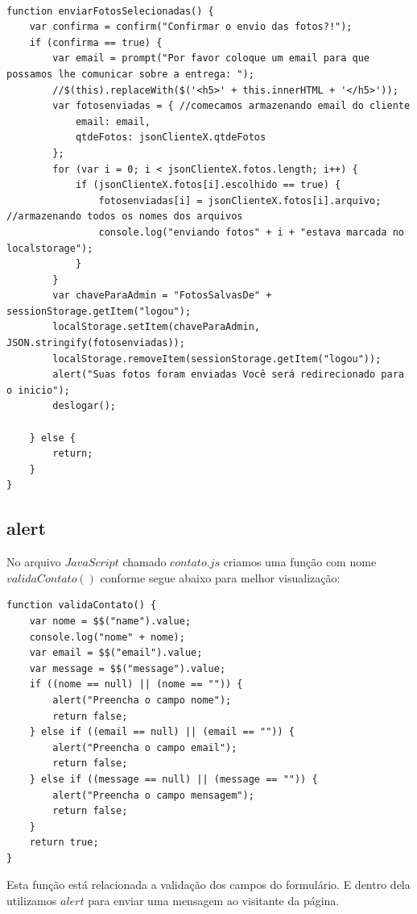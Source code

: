 \begin{lstlisting}

function enviarFotosSelecionadas() {
    var confirma = confirm("Confirmar o envio das fotos?!");
    if (confirma == true) {
        var email = prompt("Por favor coloque um email para que possamos lhe comunicar sobre a entrega: ");
        //$(this).replaceWith($('<h5>' + this.innerHTML + '</h5>'));
        var fotosenviadas = { //comecamos armazenando email do cliente
            email: email,
            qtdeFotos: jsonClienteX.qtdeFotos
        };
        for (var i = 0; i < jsonClienteX.fotos.length; i++) {
            if (jsonClienteX.fotos[i].escolhido == true) {
                fotosenviadas[i] = jsonClienteX.fotos[i].arquivo; //armazenando todos os nomes dos arquivos
                console.log("enviando fotos" + i + "estava marcada no localstorage");
            }
        }
        var chaveParaAdmin = "FotosSalvasDe" + sessionStorage.getItem("logou");
        localStorage.setItem(chaveParaAdmin, JSON.stringify(fotosenviadas));
        localStorage.removeItem(sessionStorage.getItem("logou"));
        alert("Suas fotos foram enviadas Você será redirecionado para o inicio");
        deslogar();

    } else {
        return;
    }
}
\end{lstlisting}

\subsection{alert}

	No arquivo $JavaScript$ chamado $contato.js$ criamos uma função com nome $validaContato()$ conforme segue abaixo para melhor visualização:
	
\begin{lstlisting}
function validaContato() {
    var nome = $$("name").value;
    console.log("nome" + nome);
    var email = $$("email").value;
    var message = $$("message").value;
    if ((nome == null) || (nome == "")) {
        alert("Preencha o campo nome");
        return false;
    } else if ((email == null) || (email == "")) {
        alert("Preencha o campo email");
        return false;
    } else if ((message == null) || (message == "")) {
        alert("Preencha o campo mensagem");
        return false;
    }
    return true;
}
\end{lstlisting}
	Esta função está relacionada a validação dos campos do formulário. E dentro dela utilizamos $alert$ para enviar uma mensagem ao visitante da página.

